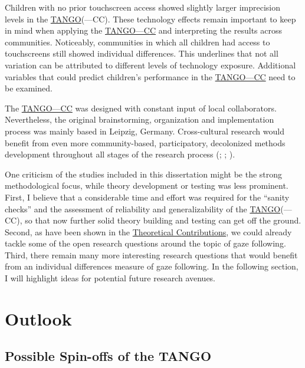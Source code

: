\documentclass[
]{scrbook}
\begin{document}
Children with no prior touchscreen access showed slightly larger imprecision levels in the \hyperref[acronyms_TANGO]{TANGO}(---CC). These technology effects remain important to keep in mind when applying the \hyperref[acronyms_TANGOux2014CC]{TANGO---CC} and interpreting the results across communities. Noticeably, communities in which all children had access to touchscreens still showed individual differences. This underlines that not all variation can be attributed to different levels of technology exposure. Additional variables that could predict children's performance in the \hyperref[acronyms_TANGOux2014CC]{TANGO---CC} need to be examined.

The \hyperref[acronyms_TANGOux2014CC]{TANGO---CC} was designed with constant input of local collaborators. Nevertheless, the original brainstorming, organization and implementation process was mainly based in Leipzig, Germany. Cross-cultural research would benefit from even more community-based, participatory, decolonized methods development throughout all stages of the research process (; ; ).

One criticism of the studies included in this dissertation might be the strong methodological focus, while theory development or testing was less prominent. First, I believe that a considerable time and effort was required for the ``sanity checks'' and the assessment of reliability and generalizability of the \hyperref[acronyms_TANGO]{TANGO}(---CC), so that now further solid theory building and testing can get off the ground. Second, as have been shown in the \hyperref[theoreticalcontributions]{Theoretical Contributions}, we could already tackle some of the open research questions around the topic of gaze following. Third, there remain many more interesting research questions that would benefit from an individual differences measure of gaze following. In the following section, I will highlight ideas for potential future research avenues.

\section{Outlook}\label{outlook}

\subsection{Possible Spin-offs of the TANGO}\label{possible-spin-offs-of-the-tango}
\end{document}
